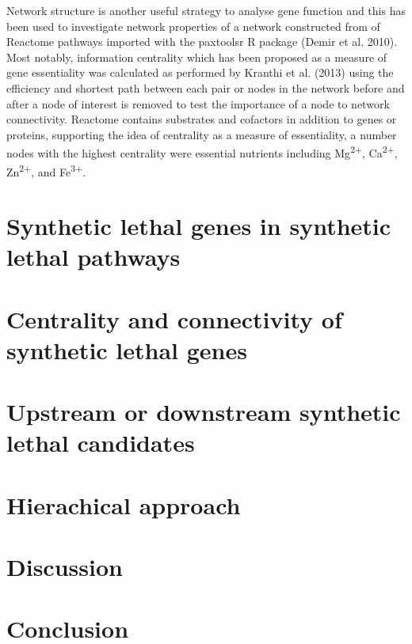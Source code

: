 Network structure is another useful strategy to analyse gene function and this has been used to investigate network properties of a network constructed from of Reactome pathways imported with the paxtoolsr R package (Demir et al. 2010). Most notably, information centrality which has been proposed as a measure of gene essentiality was calculated as performed by Kranthi et al. (2013) using the efficiency and shortest path between each pair or nodes in the network before and after a node of interest is removed to test the importance of a node to network connectivity. Reactome contains substrates and cofactors in addition to genes or proteins, supporting the idea of centrality as a measure of essentiality, a number nodes with the highest centrality were essential nutrients including Mg\textsuperscript{2$+$}, Ca\textsuperscript{2$+$}, Zn\textsuperscript{2$+$},  and Fe\textsuperscript{3$+$}.

\section{Synthetic lethal genes in synthetic lethal pathways}

\section{Centrality and connectivity of synthetic lethal genes}

\section{Upstream or downstream synthetic lethal candidates}

\section{Hierachical approach}

\section{Discussion}

\section{Conclusion}